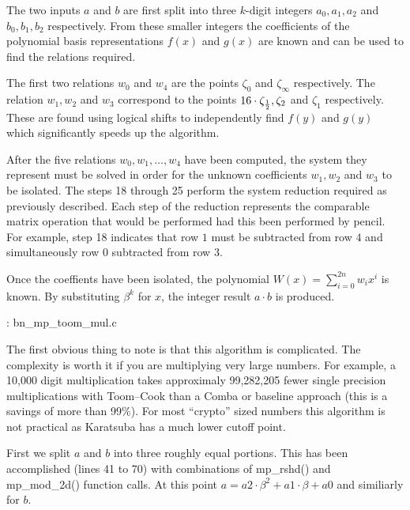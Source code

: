 \documentclass[b5paper]{book}
\begin{document}
The two inputs $a$ and $b$ are first split into three $k$-digit integers $a_0, a_1, a_2$ and $b_0, b_1, b_2$ respectively.  From these smaller
integers the coefficients of the polynomial basis representations $f(x)$ and $g(x)$ are known and can be used to find the relations required.

The first two relations $w_0$ and $w_4$ are the points $\zeta_{0}$ and $\zeta_{\infty}$ respectively.  The relation $w_1, w_2$ and $w_3$ correspond
to the points $16 \cdot \zeta_{1 \over 2}, \zeta_{2}$ and $\zeta_{1}$ respectively.  These are found using logical shifts to independently find
$f(y)$ and $g(y)$ which significantly speeds up the algorithm.

After the five relations $w_0, w_1, \ldots, w_4$ have been computed, the system they represent must be solved in order for the unknown coefficients 
$w_1, w_2$ and $w_3$ to be isolated.  The steps 18 through 25 perform the system reduction required as previously described.  Each step of
the reduction represents the comparable matrix operation that would be performed had this been performed by pencil.  For example, step 18 indicates
that row $1$ must be subtracted from row $4$ and simultaneously row $0$ subtracted from row $3$.  

Once the coeffients have been isolated, the polynomial $W(x) = \sum_{i=0}^{2n} w_i x^i$ is known.  By substituting $\beta^{k}$ for $x$, the integer 
result $a \cdot b$ is produced.

\vspace{+3mm}\begin{small}
\hspace{-5.1mm}{\bf File}: bn\_mp\_toom\_mul.c
\vspace{-3mm}
\begin{alltt}
\end{alltt}
\end{small}

The first obvious thing to note is that this algorithm is complicated.  The complexity is worth it if you are multiplying very 
large numbers.  For example, a 10,000 digit multiplication takes approximaly 99,282,205 fewer single precision multiplications with
Toom--Cook than a Comba or baseline approach (this is a savings of more than 99$\%$).  For most ``crypto'' sized numbers this
algorithm is not practical as Karatsuba has a much lower cutoff point.

First we split $a$ and $b$ into three roughly equal portions.  This has been accomplished (lines 41 to 70) with 
combinations of mp\_rshd() and mp\_mod\_2d() function calls.  At this point $a = a2 \cdot \beta^2 + a1 \cdot \beta + a0$ and similiarly
for $b$.  
\end{document}

